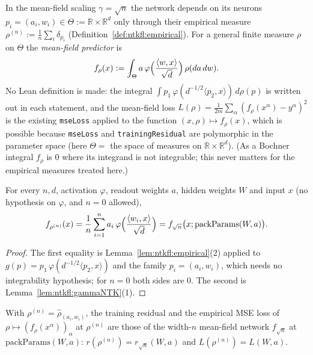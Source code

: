 In the mean-field scaling $\gamma=\sqrt n$ the network depends on its neurons $p_i=(a_i,w_i)\in\Theta:=\mathbb R\times\mathbb R^d$ only through their empirical measure
$\rho^{(n)}:=\frac1n\sum_i\delta_{p_i}$ (Definition~\ref{def:ntkfl:empirical}). For a general finite measure $\rho$ on $\Theta$ the \emph{mean-field predictor} is
\[
  f_\rho(x):=\int_\Theta a\,\varphi\Bigl(\frac{\langle w,x\rangle}{\sqrt d}\Bigr)\,\rho(da\,dw).
\]
No Lean definition is made: the integral $\int p_1\,\varphi(d^{-1/2}\langle p_2,x\rangle)\,d\rho(p)$ is written out in each statement, and the mean-field loss
$L(\rho)=\frac1{2m}\sum_\alpha(f_\rho(x^\alpha)-y^\alpha)^2$ is the existing \texttt{mseLoss} applied to the function $(x,\rho)\mapsto f_\rho(x)$, which is possible because \texttt{mseLoss} and \texttt{trainingResidual} are polymorphic in the parameter space (here $\Theta=$ the space of measures on $\mathbb R\times\mathbb R^d$). (As a Bochner integral $f_\rho$ is $0$ where its integrand is not integrable; this never matters for the empirical measures treated here.)

\begin{theorem}\label{thm:ntkfl:integralRep}
  \leanok
For every $n,d$, activation $\varphi$, readout weights $a$, hidden weights $W$ and input $x$ (no hypothesis on $\varphi$, and $n=0$ allowed),
\[
  f_{\rho^{(n)}}(x)=\frac1n\sum_{i=1}^na_i\,\varphi\Bigl(\frac{\langle w_i,x\rangle}{\sqrt d}\Bigr)=f_{\sqrt n}\bigl(x;\mathrm{packParams}(W,a)\bigr).
\]
\end{theorem}

\begin{proof}
  \leanok
The first equality is Lemma~\ref{lem:ntkfl:empirical}(2) applied to $g(p)=p_1\,\varphi(d^{-1/2}\langle p_2,x\rangle)$ and the family $p_i=(a_i,w_i)$, which needs no integrability hypothesis; for $n=0$ both sides are $0$. The second is Lemma~\ref{lem:ntkfl:gammaNTK}(1).
\end{proof}

\begin{theorem}\label{thm:ntkfl:lossRep}
  \leanok
With $\rho^{(n)}=\hat\rho_{(a_i,w_i)}$, the training residual and the empirical MSE loss of $\rho\mapsto(f_\rho(x^\alpha))_\alpha$ at $\rho^{(n)}$ are those of the width-$n$ mean-field network $f_{\sqrt n}$ at $\mathrm{packParams}(W,a)$:
$r(\rho^{(n)})=r_{\sqrt n}(W,a)$ and $L(\rho^{(n)})=L(W,a)$.
\end{theorem}

